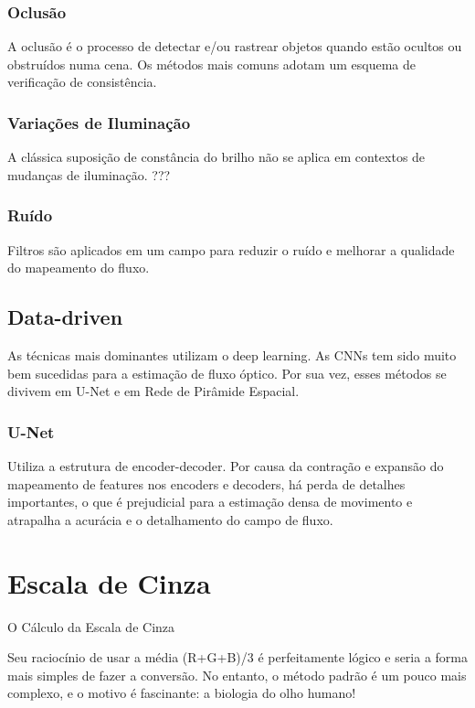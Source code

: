 \documentclass[12pt, a4paper]{article}
\begin{document}
\subsubsection{Oclusão}

A oclusão é o processo de detectar e/ou rastrear objetos quando estão ocultos ou obstruídos numa cena. Os métodos mais comuns adotam um esquema de verificação de consistência.

\subsubsection{Variações de Iluminação}

A clássica suposição de constância do brilho não se aplica em contextos de mudanças de iluminação. ???

\subsubsection{Ruído}

Filtros são aplicados em um campo para reduzir o ruído e melhorar a qualidade do mapeamento do fluxo.

\subsection{Data-driven}

As técnicas mais dominantes utilizam o deep learning. As CNNs tem sido muito bem sucedidas para a estimação de fluxo óptico. Por sua vez, esses métodos se divivem em U-Net e em Rede de Pirâmide Espacial.

\subsubsection{U-Net}

Utiliza a estrutura de encoder-decoder. Por causa da contração e expansão do mapeamento de features nos encoders e decoders, há perda de detalhes importantes, o que é prejudicial para a estimação densa de movimento e atrapalha a acurácia e o detalhamento do campo de fluxo.

\section{Escala de Cinza}
O Cálculo da Escala de Cinza

Seu raciocínio de usar a média (R+G+B)/3 é perfeitamente lógico e seria a forma mais simples de fazer a conversão. No entanto, o método padrão é um pouco mais complexo, e o motivo é fascinante: a biologia do olho humano!
\end{document}
